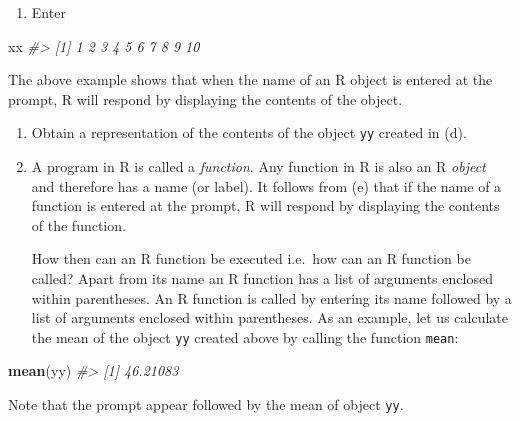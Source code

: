 \documentclass[
]{book}
\newenvironment{Shaded}{\begin{snugshade}}{\end{snugshade}}
\newcommand{\CommentTok}[1]{\textcolor[rgb]{0.56,0.35,0.01}{\textit{#1}}}
\newcommand{\FunctionTok}[1]{\textcolor[rgb]{0.13,0.29,0.53}{\textbf{#1}}}
\newcommand{\NormalTok}[1]{#1}
\providecommand{\tightlist}{%
  \setlength{\itemsep}{0pt}\setlength{\parskip}{0pt}}
\begin{document}
\begin{enumerate}
\def\labelenumi{(\alph{enumi})}
\setcounter{enumi}{4}
\tightlist
\item
  Enter
\end{enumerate}

\begin{Shaded}
\begin{Highlighting}[]
\NormalTok{xx}
\CommentTok{\#\textgreater{}  [1]  1  2  3  4  5  6  7  8  9 10}
\end{Highlighting}
\end{Shaded}

The above example shows that {when the name of an R object is entered at the prompt, R will respond by displaying the contents of the object}.

\begin{enumerate}
\def\labelenumi{(\alph{enumi})}
\setcounter{enumi}{5}
\item
  Obtain a representation of the contents of the object \texttt{yy} created in (d).
\item
  A program in R is called a \emph{{function}}. Any function in R is also an R \emph{{object}} and therefore has a name (or label). It follows from (e) that if the name of a function is entered at the prompt, R will respond by displaying the contents of the function.

  How then can an R function be executed i.e.~how can an R function be called? Apart from its name an R function has a list of arguments enclosed within parentheses. An R function is called by entering its name followed by a list of arguments enclosed within parentheses. As an example, let us calculate the mean of the object \texttt{yy} created above by calling the function \texttt{mean}:
\end{enumerate}

\begin{Shaded}
\begin{Highlighting}[]
\FunctionTok{mean}\NormalTok{(yy) }
\CommentTok{\#\textgreater{} [1] 46.21083}
\end{Highlighting}
\end{Shaded}

Note that the prompt appear followed by the mean of object \texttt{yy}.
\end{document}
